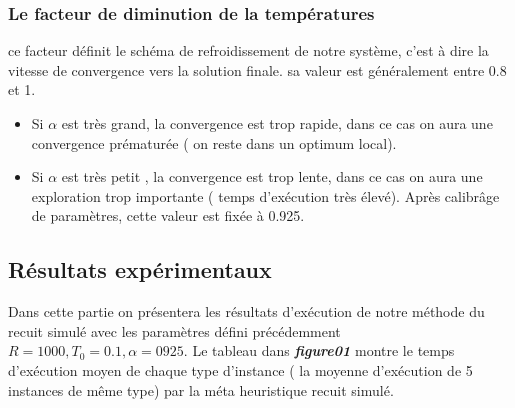 \documentclass[12pt]{article}
\begin{document}
\subsubsection{Le facteur de diminution de la températures}
ce facteur définit le schéma de refroidissement de notre système, c’est à dire la vitesse de convergence vers la solution finale.  sa valeur est généralement  entre 0.8 et 1.
\begin{itemize}
    \item Si $ \alpha $ est très grand, la convergence est trop rapide, dans ce cas on aura une convergence prématurée ( on reste dans un optimum local).
    \item Si $ \alpha $ est très petit , la convergence est trop lente, dans ce cas on aura une exploration trop importante ( temps d'exécution très élevé).
Après calibrâge de paramètres, cette valeur est fixée à 0.925.    
\end{itemize}

\subsection{Résultats expérimentaux}
Dans cette partie on présentera les résultats d'exécution de notre méthode du recuit simulé avec les paramètres défini précédemment \textbf{$R=1000,T_{0}=0.1,\alpha =0925$}.
Le tableau dans \textbf{ \emph{figure01} } montre le temps d'exécution moyen de chaque type d’instance 
( la moyenne d'exécution de 5 instances de même type)  par la méta heuristique recuit simulé.
\end{document}

